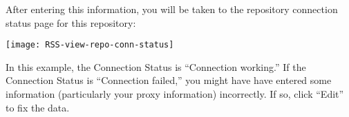 After entering this information, you will be taken to the repository
connection status page for this repository:

\texttt{[image: RSS-view-repo-conn-status]}

In this example, the Connection Status is ``Connection working.''  If the
Connection Status is ``Connection failed,'' you might have have entered
some information (particularly your proxy information) incorrectly. If
so, click ``Edit'' to fix the data.
